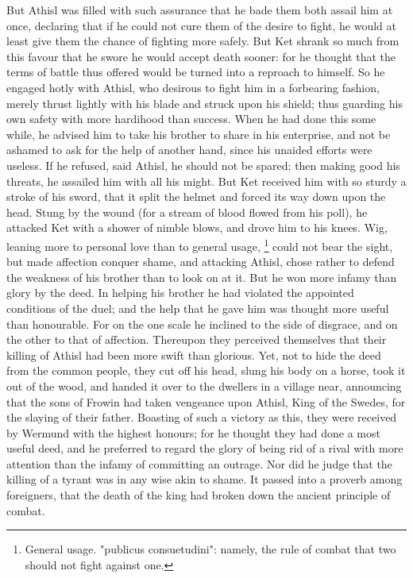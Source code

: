 \documentclass[10pt,a4paper]{report}
\begin{document}
But Athisl was filled with such assurance that he bade them both assail him at once, declaring that if he could not cure them of the desire to fight, he would at least give them the chance of fighting more safely. But Ket shrank so much from this favour that he swore he would accept death sooner: for he thought that the terms of battle thus offered would be turned into a reproach to himself. So he engaged hotly with Athisl, who desirous to fight him in a forbearing fashion, merely thrust lightly with his blade and struck upon his shield; thus guarding his own safety with more hardihood than success. When he had done this some while, he advised him to take his brother to share in his enterprise, and not be ashamed to ask for the help of another hand, since his unaided efforts were useless. If he refused, said Athisl, he should not be spared; then making good his threats, he assailed him with all his might. But Ket received him with so sturdy a stroke of his sword, that it split the helmet and forced its way down upon the head. Stung by the wound (for a stream of blood flowed from his poll), he attacked Ket with a shower of nimble blows, and drove him to his knees. Wig, leaning more to personal love than to general usage, \footnote{General usage.  "publicus consuetudini": namely, the rule of combat that two should not fight against one.} could not bear the sight, but made affection conquer shame, and attacking Athisl, chose rather to defend the weakness of his brother than to look on at it. But he won more infamy than glory by the deed. In helping his brother he had violated the appointed conditions of the duel; and the help that he gave him was thought more useful than honourable. For on the one scale he inclined to the side of disgrace, and on the other to that of affection. Thereupon they perceived themselves that their killing of Athisl had been more swift than glorious. Yet, not to hide the deed from the common people, they cut off his head, slung his body on a horse, took it out of the wood, and handed it over to the dwellers in a village near, announcing that the sons of Frowin had taken vengeance upon Athisl, King of the Swedes, for the slaying of their father. Boasting of such a victory as this, they were received by Wermund with the highest honours; for he thought they had done a most useful deed, and he preferred to regard the glory of being rid of a rival with more attention than the infamy of committing an outrage. Nor did he judge that the killing of a tyrant was in any wise akin to shame. It passed into a proverb among foreigners, that the death of the king had broken down the ancient principle of combat.\\
\end{document}

